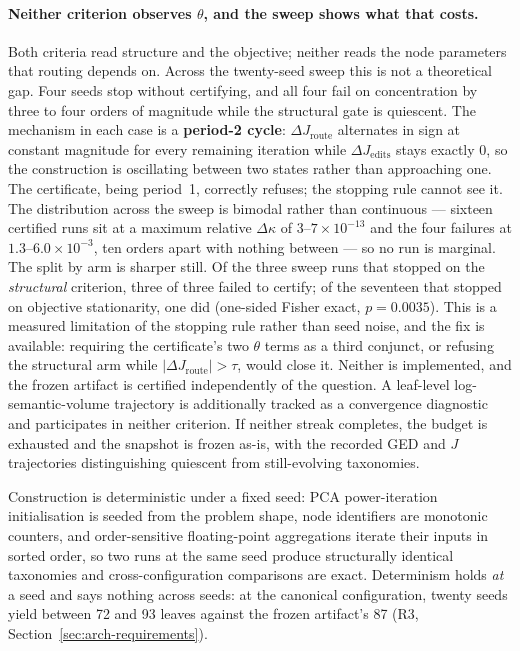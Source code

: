\paragraph{Neither criterion observes $\theta$, and the sweep shows what that costs.}
Both criteria read structure and the objective; neither reads the node parameters that
routing depends on. Across the twenty-seed sweep this is not a theoretical gap. Four
seeds stop without certifying, and all four fail on concentration by three to four orders
of magnitude while the structural gate is quiescent. The mechanism in each case is a
\textbf{period-2 cycle}: $\Delta J_{\text{route}}$ alternates in sign at constant
magnitude for every remaining iteration while $\Delta J_{\text{edits}}$ stays exactly
$0$, so the construction is oscillating between two states rather than approaching one.
The certificate, being period~1, correctly refuses; the stopping rule cannot see it.
The distribution across the sweep is bimodal rather than continuous --- sixteen certified
runs sit at a maximum relative $\Delta\kappa$ of $3$--$7 \times 10^{-13}$ and the four
failures at $1.3$--$6.0 \times 10^{-3}$, ten orders apart with nothing between --- so no
run is marginal.
The split by arm is sharper still. Of the three sweep runs that stopped on the
\emph{structural} criterion, three of three failed to certify; of the seventeen that
stopped on objective stationarity, one did (one-sided Fisher exact, $p = 0.0035$).
This is a measured limitation of the stopping rule rather than seed noise, and the fix is
available: requiring the certificate's two $\theta$ terms as a third conjunct, or
refusing the structural arm while $|\Delta J_{\text{route}}| > \tau$, would close it.
Neither is implemented, and the frozen artifact is certified independently of the
question.
A leaf-level log-semantic-volume trajectory is additionally tracked as a convergence
diagnostic and participates in neither criterion.
If neither streak completes, the budget is exhausted and the snapshot is frozen as-is,
with the recorded GED and $J$ trajectories distinguishing quiescent from still-evolving
taxonomies.

Construction is deterministic under a fixed seed: PCA power-iteration initialisation is
seeded from the problem shape, node identifiers are monotonic counters, and
order-sensitive floating-point aggregations iterate their inputs in sorted order, so two
runs at the same seed produce structurally identical taxonomies and cross-configuration
comparisons are exact. Determinism holds \emph{at} a seed and says nothing across seeds:
at the canonical configuration, twenty seeds yield between 72 and 93 leaves against the
frozen artifact's 87 (R3, Section~\ref{sec:arch-requirements}).

